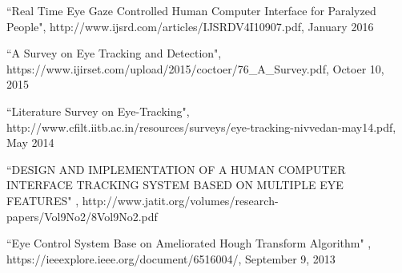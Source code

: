 \documentclass[12pt,singleside,a4paper]{article}
\begin{document}
\begin{thebibliography}{}

``Real Time Eye Gaze Controlled Human Computer  Interface for Paralyzed People", http://www.ijsrd.com/articles/IJSRDV4I10907.pdf, January 2016


``A Survey on Eye Tracking and Detection",\newline
https://www.ijirset.com/upload/2015/coctoer/76\_A\_Survey.pdf, Octoer 10, 2015


``Literature Survey on Eye-Tracking", http://www.cfilt.iitb.ac.in/resources/surveys/eye-tracking-nivvedan-may14.pdf, May 2014


``DESIGN AND IMPLEMENTATION OF A HUMAN COMPUTER INTERFACE TRACKING SYSTEM BASED ON MULTIPLE EYE FEATURES" , http://www.jatit.org/volumes/research-papers/Vol9No2/8Vol9No2.pdf


``Eye Control System Base on Ameliorated Hough Transform Algorithm" , https://ieeexplore.ieee.org/document/6516004/, September 9, 2013


\end{thebibliography}

%
\end{document}
